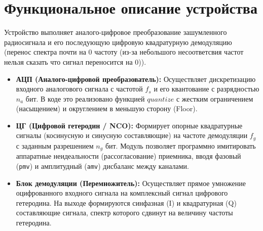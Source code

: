 
\section{Функциональное описание устройства}

Устройство выполняет аналого-цифровое преобразование зашумленного радиосигнала и его последующую цифровую квадратурную демодуляцию (перенос спектра почти на 0 частоту (из-за небольшого несоответсвия частот нельзя сказать что сигнал переносится на 0)).

\begin{itemize}
    \item \textbf{АЦП (Аналого-цифровой преобразователь):} Осуществляет дискретизацию входного аналогового сигнала с частотой $f_s$ и его квантование с разрядностью $n_a$ бит. В коде это реализовано функцией $quantize$ с жестким ограничением (насыщением) и округлением в меньшую сторону (Floor).
    \item \textbf{ЦГ (Цифровой гетеродин / NCO):} Формирует опорные квадратурные сигналы (косинусную и синусную составляющие) на частоте демодуляции $f_g$ с заданным разрешением $n_g$ бит. Модуль позволяет программно имитировать аппаратные неидеальности (рассогласование) приемника, вводя фазовый (\texttt{pmv}) и амплитудный (\texttt{amv}) дисбаланс между каналами.
    \item \textbf{Блок демодуляции (Перемножитель):} Осуществляет прямое умножение оцифрованного входного сигнала на комплексный сигнал цифрового гетеродина. На выходе формируются синфазная (I) и квадратурная (Q) составляющие сигнала, спектр которого сдвинут на величину частоты гетеродина.
\end{itemize}

